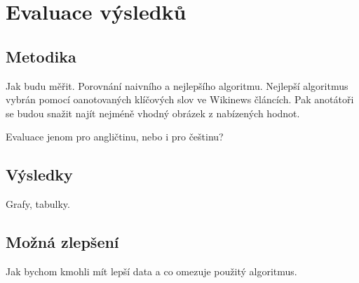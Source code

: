 
\chapter{Evaluace výsledků}

\section{Metodika}

Jak budu měřit. Porovnání naivního a nejlepšího algoritmu. Nejlepší algoritmus vybrán pomocí oanotovaných klíčových slov ve Wikinews článcích. Pak anotátoři se budou snažit najít nejméně vhodný obrázek z nabízených hodnot.

Evaluace jenom pro angličtinu, nebo i pro češtinu?

\section{Výsledky}

Grafy, tabulky.

\section{Možná zlepšení}

Jak bychom kmohli mít lepší data a co omezuje použitý algoritmus.